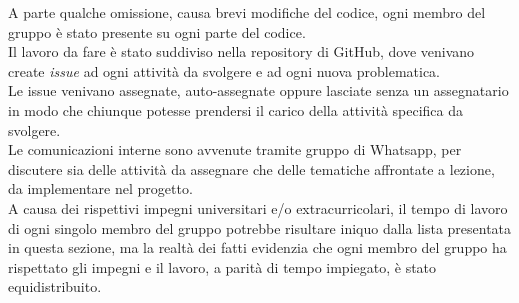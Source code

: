 A parte qualche omissione, causa brevi modifiche del codice, ogni membro del gruppo è stato presente su ogni parte del codice.\\
Il lavoro da fare è stato suddiviso nella repository di GitHub, dove venivano create \emph{issue} ad ogni attività da svolgere e ad ogni nuova problematica.\\
Le issue venivano assegnate, auto-assegnate oppure lasciate senza un assegnatario in modo che chiunque potesse prendersi il carico della attività specifica da svolgere.\\
Le comunicazioni interne sono avvenute tramite gruppo di Whatsapp, per discutere sia delle attività da assegnare che delle tematiche affrontate a lezione, da implementare nel progetto.\\
A causa dei rispettivi impegni universitari e/o extracurricolari, il tempo di lavoro di ogni singolo membro del gruppo potrebbe risultare 
iniquo dalla lista presentata in questa sezione, ma la realtà dei fatti evidenzia che ogni membro del gruppo ha rispettato gli impegni e il lavoro, a parità di tempo impiegato, è stato equidistribuito.\\

 